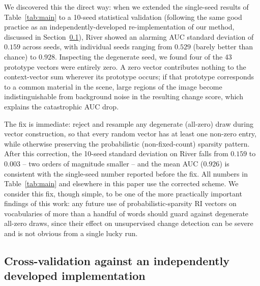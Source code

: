 \documentclass[11pt]{article}
\begin{document}
We discovered this the direct way: when we extended the single-seed results of Table~\ref{tab:main} to a 10-seed statistical validation (following the same good practice as an independently-developed re-implementation of our method, discussed in Section~\ref{sec:cross-validation}), River showed an alarming AUC standard deviation of $0.159$ across seeds, with individual seeds ranging from $0.529$ (barely better than chance) to $0.928$. Inspecting the degenerate seed, we found four of the 43 prototype vectors were entirely zero. A zero vector contributes nothing to the context-vector sum wherever its prototype occurs; if that prototype corresponds to a common material in the scene, large regions of the image become indistinguishable from background noise in the resulting change score, which explains the catastrophic AUC drop.

The fix is immediate: reject and resample any degenerate (all-zero) draw during vector construction, so that every random vector has at least one non-zero entry, while otherwise preserving the probabilistic (non-fixed-count) sparsity pattern. After this correction, the 10-seed standard deviation on River falls from $0.159$ to $0.003$ -- two orders of magnitude smaller -- and the mean AUC ($0.926$) is consistent with the single-seed number reported before the fix. All numbers in Table~\ref{tab:main} and elsewhere in this paper use the corrected scheme. We consider this fix, though simple, to be one of the more practically important findings of this work: any future use of probabilistic-sparsity RI vectors on vocabularies of more than a handful of words should guard against degenerate all-zero draws, since their effect on unsupervised change detection can be severe and is not obvious from a single lucky run.

\subsection{Cross-validation against an independently developed implementation}
\label{sec:cross-validation}
\end{document}
